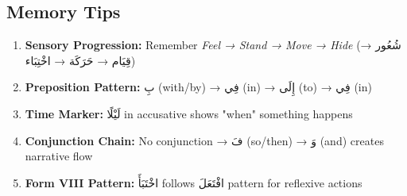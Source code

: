 \documentclass[letterpaper,12pt]{article}
\begin{document}
\subsection{Memory Tips}
\begin{enumerate}
\item \textbf{Sensory Progression:} Remember \textit{Feel → Stand → Move → Hide} (\textarabic{شُعُور} → \textarabic{قِيَام} → \textarabic{حَرَكَة} → \textarabic{اخْتِبَاء})
\item \textbf{Preposition Pattern:} \textarabic{بِ} (with/by) → \textarabic{فِي} (in) → \textarabic{إِلَى} (to) → \textarabic{فِي} (in)
\item \textbf{Time Marker:} \textarabic{لَيْلًا} in accusative shows "when" something happens
\item \textbf{Conjunction Chain:} No conjunction → \textarabic{فَ} (so/then) → \textarabic{وَ} (and) creates narrative flow
\item \textbf{Form VIII Pattern:} \textarabic{اخْتَبَأَ} follows \textarabic{افْتَعَلَ} pattern for reflexive actions
\end{enumerate}
\end{document}
